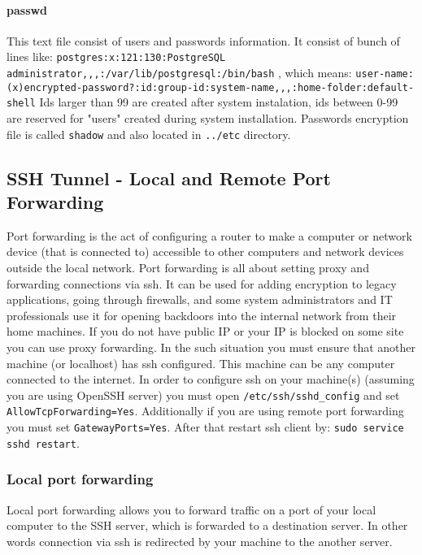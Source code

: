 \documentclass{article}[12pt]
\newcommand{\q}[1]{\texttt{#1}}
\begin{document}
\paragraph{passwd} This text file consist of users and passwords information.
It consist of bunch of lines like: \newline
\texttt{postgres:x:121:130:PostgreSQL administrator,,,:/var/lib/postgresql:/bin/bash} , which means:
\texttt{user-name:(x)encrypted-password?:id:group-id:system-name,,,:home-folder:default-shell} \newline
Ids larger than 99 are created after system instalation, ids between 0-99 are reserved for "users" created during system installation.
Passwords encryption file is called \texttt{shadow} and also located in \texttt{../etc} directory.


\subsection{SSH Tunnel - Local and Remote Port Forwarding}
Port forwarding is the act of configuring a router to make a computer or network device (that is connected to) accessible to other computers and network devices outside the local network.
Port forwarding is all about setting proxy and forwarding connections via ssh.
It can be used for adding encryption to legacy applications, going through firewalls, and some system administrators and IT professionals use it for opening backdoors into the internal network from their home machines.
If you do not have public IP or your IP is blocked on some site you can use proxy forwarding.
In the such situation you must ensure that another machine (or localhost) has ssh configured.
This machine can be any computer connected to the internet.
In order to configure ssh on your machine(s) (assuming you are using OpenSSH server) you must open \q{/etc/ssh/sshd\_config} and set \q{AllowTcpForwarding=Yes}.
Additionally if you are using remote port forwarding you must set \q{GatewayPorts=Yes}.
After that restart ssh client by: \q{sudo service sshd restart}.

\subsubsection{Local port forwarding}
Local port forwarding allows you to forward traffic on a port of your local computer to the SSH server, which is forwarded to a destination server.
In other words connection via ssh is redirected by your machine to the another server.
\end{document}
